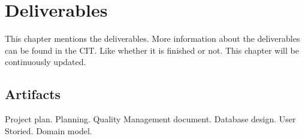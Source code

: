 \chapter{Deliverables}
This chapter mentions the deliverables. More information about the deliverables can be found in the CIT. Like whether it is finished or not. This chapter will be continuously updated.

\section{Artifacts}
Project plan.
Planning.
Quality Management document.
Database design.
User Storied.
Domain model.